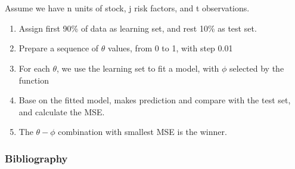 \documentclass[12pt]{beamer}
\begin{document}
	\section*{}
\begin{frame}
Assume we have n units of stock, j risk factors, and t observations.\\
\begin{enumerate}
\item Assign first 90\% of data as learning set, and rest 10\% as test set.
\item Prepare a sequence of $\theta$ values, from 0 to 1, with step 0.01
\item For each $\theta$, we use the learning set to fit a model, with $\phi$ selected by the function
\item Base on the fitted model, makes prediction and compare with the test set, and calculate the MSE.
\item The $\theta-\phi$ combination with smallest MSE is the winner.
\end{enumerate}
\end{frame}

\begin{frame}[allowframebreaks]
	\frametitle{Bibliography}
	
{\footnotesize}
\end{frame}
\end{document}

